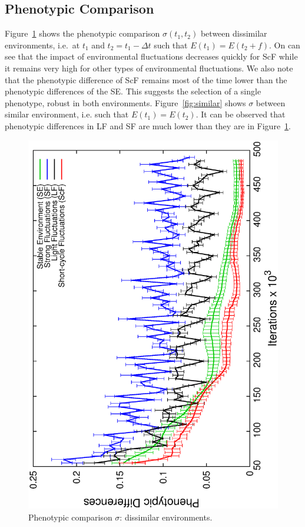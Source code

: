 \subsection{Phenotypic Comparison}

Figure~\ref{fig:dissimilar} shows the phenotypic comparison $\sigma(t_1, t_2)$ between dissimilar environments, i.e.~at $t_1$ and $t_2 = t_1 - \Delta t$ such that $E(t_1) = E(t_2 + f)$. On can see that the impact of environmental fluctuations decreases quickly for ScF while it remains very high for other types of environmental fluctuations. We also note that the phenotypic difference of ScF remains most of the time lower than the phenotypic differences of the SE. This suggests the selection of a single phenotype, robust in both environments. Figure~\ref{fig:similar} shows $\sigma$ between similar environment, i.e. such that $E(t_1) = E(t_2)$. It can be observed that phenotypic differences in LF and SF are much lower than they are in Figure~\ref{fig:dissimilar}.

\begin{figure}[h]
\centering
\includegraphics[width=0.7\columnwidth, angle=-90]{img/diffProp}
\caption{Phenotypic comparison $\sigma$: dissimilar environments.}
\label{fig:dissimilar}
\end{figure}


